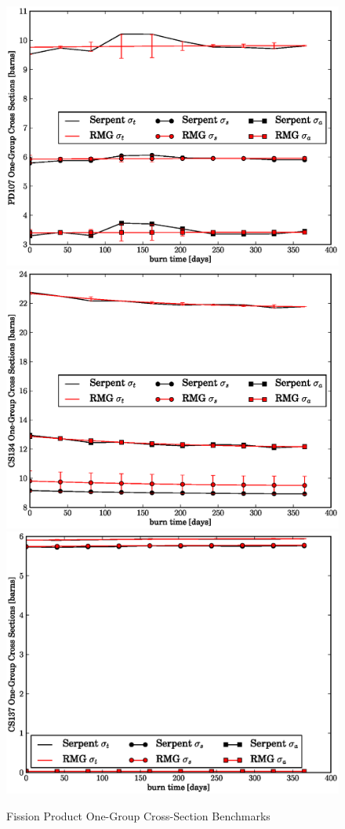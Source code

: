 \begin{figure}[htbp]
\caption{Fission Product One-Group Cross-Section Benchmarks}
\label{fp_xs_benchmark}
\begin{center}
\includegraphics[scale=0.3]{multigroup_method/figs/benchmark/PD107_1g_xs.eps}
\includegraphics[scale=0.3]{multigroup_method/figs/benchmark/CS134_1g_xs.eps}
\includegraphics[scale=0.3]{multigroup_method/figs/benchmark/CS137_1g_xs.eps}

\end{center}
\end{figure}
